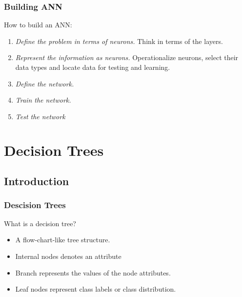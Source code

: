 \documentclass{beamer}
\begin{document}
\begin{frame}
    \frametitle{Building ANN}

How to build an ANN:

\begin{enumerate}
    \item \textit{Define the problem in terms of neurons.} Think in terms of the layers.
    \item \textit{Represent the information as neurons.} Operationalize neurons, select their data types and locate data for testing and learning.
    \item \textit{Define the network.}
    \item \textit{Train the network.}
    \item \textit{Test the network}
\end{enumerate}

\end{frame}




\section{Decision Trees}

\subsection{Introduction}

\begin{frame}
    \frametitle{Descision Trees}

What is a decision tree?

    \begin{itemize}
        \item A flow-chart-like tree structure.
        \item Internal nodes denotes an attribute
        \item Branch represents the values of the node attributes.
        \item Leaf nodes represent class labels or class distribution.
    \end{itemize}   

\end{frame}
\end{document}
